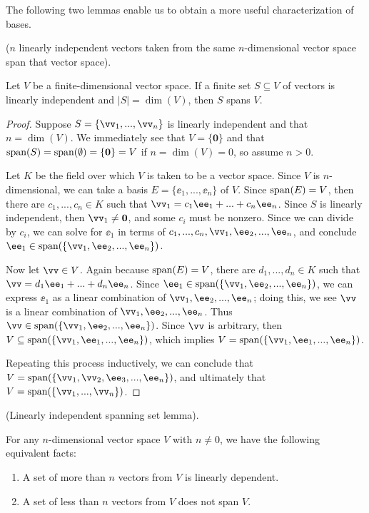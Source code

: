 The following two lemmas enable us to obtain a more useful characterization of bases.

\begin{lemma}
\label{ch::lin_alg::lemma::n_lin_indep_vectors_span_n_dim_space}
    ($n$ linearly independent vectors taken from the same $n$-dimensional vector space span that vector space).

    Let $V$ be a finite-dimensional vector space. If a finite set $S \subseteq V$ of vectors is linearly independent and $|S| = \dim(V)$, then $S$ spans $V$.
\end{lemma}

\begin{proof}

   Suppose $S = \{\vv_1, ..., \vv_n\}$ is linearly independent and that $n = \dim(V)$. We immediately see that $V = \{\mathbf{0}\}$ and that $\text{span}(S) = \text{span}(\emptyset) = \{\mathbf{0}\} = V$ if $n = \dim(V) = 0$, so assume $n > 0$.
   
   Let $K$ be the field over which $V$ is taken to be a vector space. Since $V$ is $n$-dimensional, we can take a basis $E = \{\ee_1, ..., \ee_n\}$ of $V$. Since $\text{span}(E) = V$, then there are $c_1, ..., c_n \in K$ such that ${\vv_1 = c_1 \ee_1 + ... + c_n \ee_n}$. Since $S$ is linearly independent, then $\vv_1 \neq \mathbf{0}$, and some $c_i$ must be nonzero. Since we can divide by $c_i$, we can solve for $\ee_1$ in terms of $c_1, ..., c_n, \vv_1, \ee_2, ..., \ee_n$, and conclude $\ee_1 \in \spann(\{\vv_1, \ee_2, ..., \ee_n\})$. 
   
   Now let $\vv \in V$. Again because $\text{span}(E) = V$, there are $d_1, ..., d_n \in K$ such that $\vv = d_1 \ee_1 + ... + d_n \ee_n$. Since $\ee_1 \in \spann(\{\vv_1, \ee_2, ..., \ee_n\})$, we can express $\ee_1$ as a linear combination of $\vv_1, \ee_2, ..., \ee_n$; doing this, we see $\vv$ is a linear combination of $\vv_1, \ee_2, ..., \ee_n$. Thus $\vv \in \spann(\{\vv_1, \ee_2, ..., \ee_n\})$. Since $\vv$ is arbitrary, then ${V \subseteq \spann(\{\vv_1, \ee_1, ..., \ee_n\})}$, which implies $V = \spann(\{\vv_1, \ee_1, ..., \ee_n\})$.

    Repeating this process inductively, we can conclude that $V = \spann(\{\vv_1, \vv_2, \ee_3, ..., \ee_n\})$, and ultimately that $V = \spann(\{\vv_1, ..., \vv_n\})$. 
\end{proof}

\begin{lemma}
\label{ch::lin_alg::lemma::dimension}
    (Linearly independent spanning set lemma). 
    
    For any $n$-dimensional vector space $V$ with $n \neq 0$, we have the following equivalent facts:
    
    \begin{enumerate}
        \item A set of more than $n$ vectors from $V$ is linearly dependent.
        \item A set of less than $n$ vectors from $V$ does not span $V$.
    \end{enumerate}
\end{lemma}

